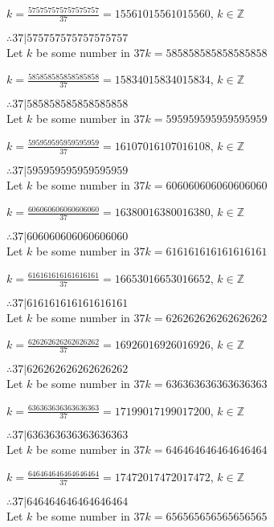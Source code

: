 \documentclass{article}
\begin{document}
$k = \frac{575757575757575757}{37} = 15561015561015560$, $k \in \mathbb{Z}$

$ \therefore  37|575757575757575757 $ \\

Let $k$ be some number in $37k = 585858585858585858$

$k = \frac{585858585858585858}{37} = 15834015834015834$, $k \in \mathbb{Z}$

$ \therefore  37|585858585858585858 $ \\

Let $k$ be some number in $37k = 595959595959595959$

$k = \frac{595959595959595959}{37} = 16107016107016108$, $k \in \mathbb{Z}$

$ \therefore  37|595959595959595959 $ \\

Let $k$ be some number in $37k = 606060606060606060$

$k = \frac{606060606060606060}{37} = 16380016380016380$, $k \in \mathbb{Z}$

$ \therefore  37|606060606060606060 $ \\

Let $k$ be some number in $37k = 616161616161616161$

$k = \frac{616161616161616161}{37} = 16653016653016652$, $k \in \mathbb{Z}$

$ \therefore  37|616161616161616161 $ \\

Let $k$ be some number in $37k = 626262626262626262$

$k = \frac{626262626262626262}{37} = 16926016926016926$, $k \in \mathbb{Z}$

$ \therefore  37|626262626262626262 $ \\

Let $k$ be some number in $37k = 636363636363636363$

$k = \frac{636363636363636363}{37} = 17199017199017200$, $k \in \mathbb{Z}$

$ \therefore  37|636363636363636363 $ \\

Let $k$ be some number in $37k = 646464646464646464$

$k = \frac{646464646464646464}{37} = 17472017472017472$, $k \in \mathbb{Z}$

$ \therefore  37|646464646464646464 $ \\

Let $k$ be some number in $37k = 656565656565656565$
\end{document}
